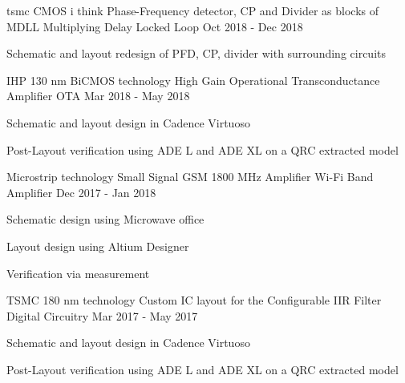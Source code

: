 \begin{cventries}

\cventry
{tsmc CMOS  i think} %
{Phase-Frequency detector, CP and Divider as blocks of MDLL} %
{Multiplying Delay Locked Loop} %
{Oct 2018 - Dec 2018} %
{ %
\begin{cvitems}
    \item {Schematic and layout redesign of PFD, CP, divider with surrounding circuits}
\end{cvitems}
}

\cventry
{IHP 130 nm BiCMOS technology} %
{High Gain Operational Transconductance Amplifier} %
{OTA} %
{Mar 2018 - May 2018} %
{ %
\begin{cvitems}
    \item {Schematic and layout design in Cadence Virtuoso}
    \item {Post-Layout verification using ADE L and ADE XL on a QRC extracted model}
\end{cvitems}
}


\cventry
{Microstrip technology} %
{Small Signal GSM 1800 MHz Amplifier} %
{Wi-Fi Band Amplifier} %
{Dec 2017 - Jan 2018} %
{ %
\begin{cvitems}
    \item {Schematic design using Microwave office}
    \item {Layout design using Altium Designer}
    \item {Verification via measurement} %
\end{cvitems}
}


\cventry
{TSMC 180 nm technology} %
{Custom IC layout for the Configurable IIR Filter} %
{Digital Circuitry} %
{Mar 2017 - May 2017} %
{ %
\begin{cvitems}
    \item {Schematic and layout design in Cadence Virtuoso}
    \item {Post-Layout verification using ADE L and ADE XL on a QRC extracted model}
\end{cvitems}
}



\end{cventries}
